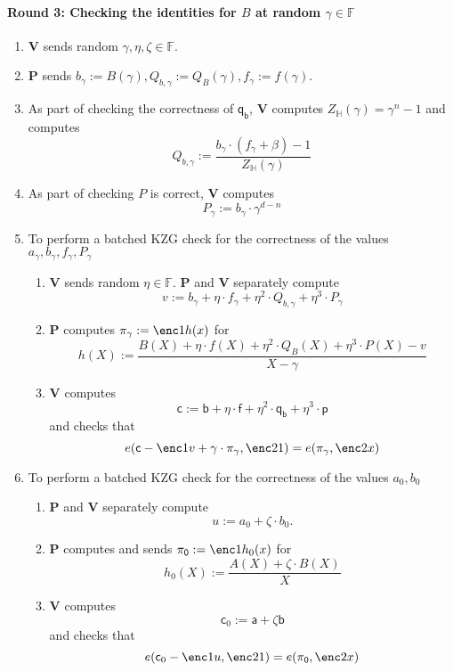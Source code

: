 \documentclass[11pt]{article} %
\newcommand{\F}{\ensuremath{\mathbb F}\xspace}
\newcommand{\defeq}{:=}
\newcommand{\prv}{\ensuremath{\mathsf{\mathbf{P}}}\xspace}
\newcommand{\ver}{\ensuremath{\mathsf{\mathbf{V}}}\xspace}
\newcommand{\subspace}{\ensuremath{\mathbb{H}}\xspace}
\newcommand{\witsize}{\ensuremath{n}\xspace}
\renewcommand{\a}{\ensuremath{\mathsf{a}}\xspace}
\renewcommand{\b}{\ensuremath{\mathsf{b}}\xspace}
\renewcommand{\c}{\ensuremath{\mathsf{c}}\xspace}
\newcommand{\f}{\ensuremath{\mathsf{f}}\xspace}
\renewcommand{\p}{\ensuremath{\mathsf{p}}\xspace}
\newcommand{\qb}{\ensuremath{\mathsf{q_b}}\xspace}
\newcommand{\agam}{\ensuremath{a_\gamma}\xspace}
\newcommand{\gamproof}{\ensuremath{\mathsf{\pi_\gamma}}\xspace}
\newcommand{\zerproof}{\ensuremath{\mathsf{\pi_0}}\xspace}
\newcommand{\bgam}{\ensuremath{b_\gamma}\xspace}
\newcommand{\qbgam}{\ensuremath{Q_{b,\gamma}}\xspace}
\newcommand{\fgam}{\ensuremath{f_{\gamma}}\xspace}
\newcommand{\pgam}{\ensuremath{P_{\gamma}}\xspace}
\begin{document}
	\paragraph{\textbf{Round 3: Checking the identities for $B$ at random $\gamma \in \F$}}
 \begin{enumerate}
\item \ver sends random $\gamma,\eta,\zeta \in \F$.
\item \prv sends $\bgam \defeq B(\gamma),\qbgam \defeq Q_B(\gamma),\fgam \defeq f(\gamma)$.
\item As part of checking the correctness of \qb, \ver computes $ Z_\subspace(\gamma) = \gamma^\witsize -1$ and computes
\[\qbgam\defeq \frac{\bgam\cdot (\fgam + \beta)-1}{Z_\subspace(\gamma)}\]
\item As part of  checking $P$ is correct, \ver computes 
\[\pgam\defeq \bgam\cdot \gamma^{d-\witsize}\]
\item To perform a batched KZG check for the correctness of the values  $\agam,\bgam,\fgam,\pgam$
  \begin{enumerate}
   \item \ver sends random $\eta\in \F$. \prv and \ver separately compute
   \[v\defeq \bgam +\eta\cdot\fgam + \eta^2\cdot \qbgam + \eta^3\cdot \pgam\]
   \item \prv computes $\gamproof\defeq \enc1{h(x)}$ for 
   \[h(X)\defeq \frac{ B(X)+ \eta\cdot f(X) + \eta^2\cdot Q_B(X) + \eta^3\cdot P(X) -v}{X-\gamma}\]
   \item \ver computes 
   \[\c\defeq \b+\eta\cdot \f +\eta^2\cdot \qb + \eta^3\cdot \p\]
   and  checks that 
   \[e(\c-\enc1{v}+\gamma\cdot \gamproof,\enc2{1})=e(\gamproof,\enc2{x})\]
  \end{enumerate}
\item To perform a batched KZG check for the correctness of the values  $a_0,b_0$
  \begin{enumerate}
   \item  \prv and \ver separately compute
   \[u\defeq a_0+\zeta \cdot b_0.\] 
   \item \prv computes and sends $\zerproof\defeq \enc1{h_0(x)}$ for 
   \[h_0(X)\defeq \frac{A(X)+\zeta\cdot B(X)}{X}\]
   \item \ver computes 
   \[\c_0 \defeq \a +\zeta \b\]
   and  checks that 
   \[e(\c_0-\enc1{u},\enc2{1})=e(\zerproof,\enc2{x})\]
  \end{enumerate}

\end{enumerate}
\end{document}
